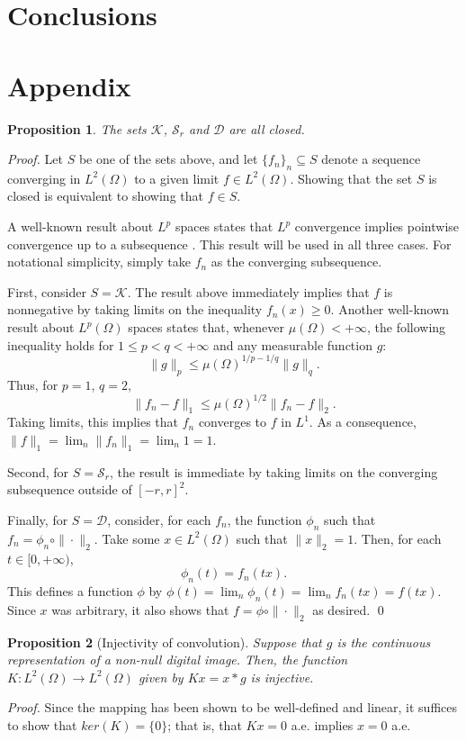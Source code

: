 \documentclass[twocolumn,twoside,a4paper,10pt]{IEEEtran}
\newtheorem{proposition}{Proposition}
\begin{document}
\section{Conclusions}

\section{Appendix}

\begin{proposition}\label{prop:closed-sets}
  The sets \(\mathcal{K}\), \(\mathcal{S}_r\) and \(\mathcal{D}\) are all closed.
\end{proposition}
\textit{Proof.} 
Let \(S\) be one of the sets above, and let \(\{f_n\}_n\subseteq S\) denote a sequence converging in \(L^2(\Omega)\) to a given limit \(f\in L^2(\Omega)\). Showing that the set \(S\) is closed is equivalent to showing that \(f\in S\).

A well-known result about \(L^p\) spaces states that \(L^p\) convergence implies pointwise convergence up to a subsequence \cite{ash1972real}. This result will be used in all three cases. For notational simplicity, simply take \(f_n\) as the converging subsequence.

First, consider \(S=\mathcal{K}\). The result above immediately implies that \(f\) is nonnegative by taking limits on the inequality \(f_n(x) \geq 0\). Another well-known result about \(L^p(\Omega)\) spaces states that, whenever \(\mu(\Omega)<+\infty\), the following inequality holds for \(1\leq p < q < +\infty\) and any measurable function \(g\):
\[
  \|g\|_p \leq \mu(\Omega)^{1/p - 1/q} \|g\|_q
.\]
Thus, for \(p=1\), \(q=2\),
\[
  \|f_n-f\|_1 \leq \mu(\Omega)^{1/2}\|f_n - f\|_2
.\]
Taking limits, this implies that \(f_n\) converges to \(f\) in \(L^1\). As a consequence, \(\|f\|_{1}=\lim_n \|f_n\|_{1}=\lim_n 1 = 1\).

Second, for \(S=\mathcal{S}_r\), the result is immediate by taking limits on the converging subsequence outside of \([-r, r]^2\).

Finally, for \(S=\mathcal{D}\), consider, for each \(f_n\), the function \(\phi_n\) such that \(f_n=\phi_n \circ \|\cdot\|_{2}\). Take some \(x\in L^2(\Omega)\) such that \(\|x\|_{2}=1\). Then, for each \(t\in[0, +\infty)\),
\[
  \phi_n(t) = f_n(tx)
.\]
This defines a function \(\phi\) by \(\phi(t)=\lim_n\phi_n(t)=\lim_nf_n(tx)=f(tx)\). Since \(x\) was arbitrary, it also shows that \(f=\phi\circ\|\cdot\|_{2}\) as desired. \qed

\begin{proposition}[Injectivity of convolution]\label{prop:injectivity-of-convolution}
  Suppose that \(g\) is the continuous representation of a non-null digital image. Then, the function \(K\colon L^2(\Omega)\to L^2(\Omega)\) given by \(Kx = x\ast g\) is injective.
\end{proposition}
\textit{Proof. } Since the mapping has been shown to be well-defined and linear, it suffices to show that \(ker(K)=\{0\}\); that is, that \(Kx=0\) a.e. implies \(x=0\) a.e.
\end{document}
